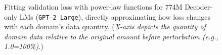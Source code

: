 \documentclass{article} %
\begin{document}




\begin{figure}\vspace{-1.4em}
\begin{minipage}{0.48\textwidth}
    \vspace{-0.2em}
    \caption{\small{Fitting validation loss with power-law functions for 774M Decoder-only LMs (\texttt{GPT-2 Large}), directly approximating how loss changes with each domain's data quantity. (\textit{X-axis depicts the quantity of domain data relative to the original amount before perturbation (e.g., 1.0=100\%).})}\normalsize}
    \label{fig:figure3}\vspace{-1em}
\end{minipage}
\end{figure}
\end{document}
